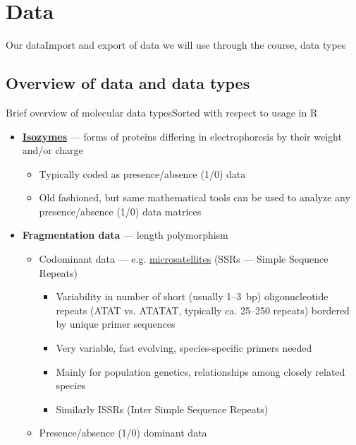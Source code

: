 \documentclass[compress, ucs, xelatex, 11pt, xcolor=svgnames, aspectratio=169,
	hyperref={
		bookmarks=true,
		unicode=true,
		colorlinks=true,
		pdftitle={Molecular data in R},
		plainpages=false,
		pdfauthor={Vojtech Zeisek},
		pdfsubject={Course about phylogeny and evolution in R},
		pdfcreator={XeLaTeX},
		pdfkeywords={R, evolution, phylogeny, molecular data},
		linkcolor=Crimson, %
		anchorcolor=Magenta, %
		citecolor=Magenta, %
		filecolor=Magenta, %
		menucolor=Magenta, %
		urlcolor=DodgerBlue, %
		pdftex},
	url={hyphens, lowtilde} %
	]{beamer}
\begin{document}
\section{Data}

\begin{frame}{Our data}{Import and export of data we will use through the course, data types}
	\tableofcontents[currentsection, sectionstyle=show/hide, hideothersubsections]
\end{frame}

\subsection[Overview]{Overview of data and data types}

\begin{frame}[allowframebreaks]{Brief overview of molecular data types}{Sorted with respect to usage in R}
	\begin{itemize}
		\item \textbf{\href{https://en.wikipedia.org/wiki/Isozyme}{Isozymes}} --- forms of proteins differing in electrophoresis by their weight and/or charge
		\begin{itemize}
			\item Typically coded as presence/absence (1/0) data
			\item Old fashioned, but same mathematical tools can be used to analyze any presence/absence (1/0) data matrices
		\end{itemize}
		\item \textbf{Fragmentation data} --- length polymorphism
		\begin{itemize}
			\item Codominant data --- e.g. \href{https://en.wikipedia.org/wiki/Microsatellite}{microsatellites} (SSRs --- Simple Sequence Repeats)
			\begin{itemize}
				\item Variability in number of short (usually 1--3~bp) oligonucleotide repeats (ATAT vs. ATATAT, typically ca. 25--250 repeats) bordered by unique primer sequences
				\item Very variable, fast evolving, species-specific primers needed
				\item Mainly for population genetics, relationships among closely related species
				\item Similarly ISSRs (Inter Simple Sequence Repeats)
			\end{itemize}
			\item Presence/absence (1/0) dominant data

\end{itemize}
\end{itemize}
\end{frame}
\end{document}
